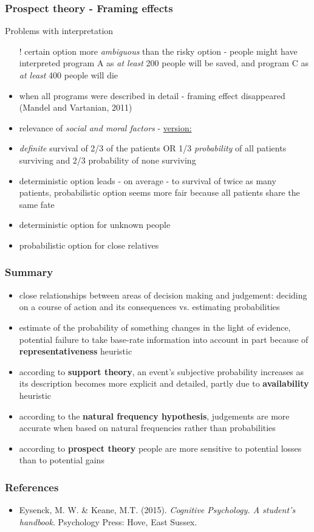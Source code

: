 \documentclass[]{beamer}
\begin{document}
\begin{frame}
\frametitle{Prospect theory - Framing effects}
\begin{overlayarea}{115mm}{80mm}
Problems with interpretation

\begin{itemize}
 \item[!] certain option more \textit{ambiguous} than the risky option - people might have interpreted program A as \textit{at least} 200 people will be saved, and program C as \textit{at least} 400 people will die
 \item<2->[$\rightarrow$] when all programs were described in detail - framing effect disappeared (Mandel and Vartanian, 2011)
 \item[]
 \item<3->[!] relevance of \textit{social and moral factors} - \underline{version:} 
 \item<4-> \textit{definite} survival of 2/3 of the patients OR 1/3 \textit{probability} of all patients surviving and 2/3 probability of none surviving
 \item<4-> deterministic option leads - on average - to survival of twice as many patients, probabilistic option seems more fair because all patients share the same fate
 \item<5->[$\Rightarrow$] deterministic option for unknown people
 \item<5->[$\Rightarrow$] probabilistic option for close relatives
\end{itemize}
\end{overlayarea}
\end{frame}



\begin{frame}
 \frametitle{Summary}
\begin{itemize}[<+->]
\setlength{\itemsep}{2pt}
 \item close relationships between areas of decision making and judgement: deciding on a course of action and its consequences vs. estimating probabilities
 \item estimate of the probability of something changes in the light of evidence, potential  failure to take base-rate information into account in part because of \textbf{representativeness} heuristic
 \item according to \textbf{support theory}, an event's subjective probability increases as its description becomes more explicit and detailed, partly due to \textbf{availability} heuristic
 \item according to the \textbf{natural frequency hypothesis}, judgements are more accurate when based on natural frequencies rather than probabilities
 \item according to \textbf{prospect theory} people are more sensitive to potential losses than to potential gains
\end{itemize}
\end{frame}



\begin{frame}
 \frametitle{References}
\begin{small}
\begin{itemize}
 \item  Eysenck, M. W. \& Keane, M.T. (2015). \textit{Cognitive Psychology. A student's handbook}. Psychology Press: Hove, East Sussex. 
\end{itemize}
\end{small}
\end{frame}
\end{document}
